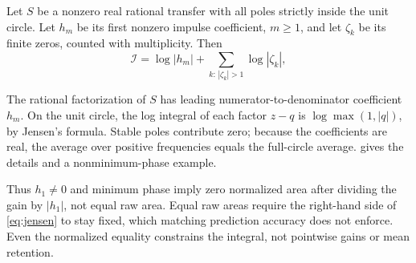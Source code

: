 \begin{proposition}
\label{prop:jensen}
Let \(S\) be a nonzero real rational transfer with all poles strictly inside the unit circle. Let \(h_m\) be its first nonzero impulse coefficient, \(m\geq 1\), and let \(\zeta_k\) be its finite zeros, counted with multiplicity. Then
\begin{equation}
  \mathcal I=\log|h_m|+\sum_{k:\,|\zeta_k|>1}\log|\zeta_k|,
  \label{eq:jensen}
\end{equation}
\end{proposition}

The rational factorization of \(S\) has leading numerator-to-denominator coefficient \(h_m\). On the unit circle, the log integral of each factor \(z-q\) is \(\log\max(1,|q|)\), by Jensen's formula. Stable poles contribute zero; because the coefficients are real, the average over positive frequencies equals the full-circle average.  gives the details and a nonminimum-phase example.

Thus \(h_1\neq 0\) and minimum phase imply zero normalized area after dividing the gain by \(|h_1|\), not equal raw area. Equal raw areas require the right-hand side of \cref{eq:jensen} to stay fixed, which matching prediction accuracy does not enforce. Even the normalized equality constrains the integral, not pointwise gains or mean retention.
